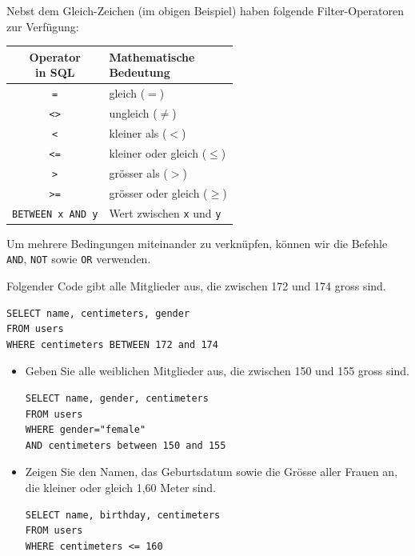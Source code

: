 Nebst dem Gleich-Zeichen (im obigen Beispiel) haben folgende Filter-Operatoren zur Verfügung:
\begin{table}[H]
 \centering
 \begin{tabular}{c|l}
 \makecell{\textbf{Operator}\\\textbf{in \gls{SQL}}} & \makecell{\textbf{Mathematische}\\\textbf{Bedeutung}} \\\midrule 
      \texttt{=} & gleich ($=$)\\
      \texttt{<>} & ungleich ($\neq$) \\
      \texttt{<} & kleiner als ($<$)\\
      \texttt{<=} & kleiner oder gleich ($\leq$) \\
      \texttt{>} & grösser als ($>$) \\
      \texttt{>=} & grösser oder gleich ($\geq$)\\
      \lstinline[style=sql]|BETWEEN x AND y| & Wert zwischen \texttt{x} und \texttt{y}\\
 \end{tabular}
\end{table}
Um mehrere Bedingungen miteinander zu verknüpfen, können wir die Befehle \lstinline[style=sql]|AND|, \lstinline[style=sql]|NOT| sowie \lstinline[style=sql]|OR| verwenden.

\begin{myexample}
Folgender Code gibt alle Mitglieder aus, die zwischen 172 und 174 gross sind.
\begin{lstlisting}[style=sql]
SELECT name, centimeters, gender 
FROM users 
WHERE centimeters BETWEEN 172 and 174 
\end{lstlisting}

\end{myexample}

\begin{aufgabe}{}
\begin{itemize}
	\item Geben Sie alle weiblichen Mitglieder aus, die zwischen 150 und 155 gross sind.
	\begin{myantwort}
\begin{lstlisting}[style=sql]
SELECT name, gender, centimeters
FROM users
WHERE gender="female"
AND centimeters between 150 and 155
\end{lstlisting}
	\end{myantwort}
\item Zeigen Sie den Namen, das Geburtsdatum sowie die Grösse aller Frauen an, die kleiner oder gleich 1,60 Meter sind.
\begin{myantwort}
\begin{lstlisting}[style=sql]
SELECT name, birthday, centimeters
FROM users
WHERE centimeters <= 160
\end{lstlisting}
\end{myantwort}
\end{itemize}
\end{aufgabe}

